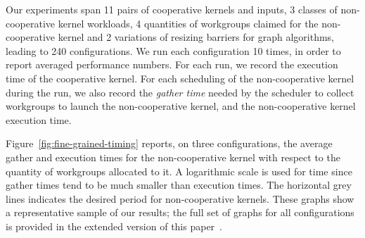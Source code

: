 \documentclass[sigconf]{acmart}
\newcommand{\myfiglong}{Figure~}
\begin{document}
{Our experiments span 11 pairs of cooperative kernels and inputs, 3
classes of non-cooperative kernel workloads, 4 quantities of
workgroups claimed for the non-cooperative kernel and 2 variations of
resizing barriers for graph algorithms, leading to 240 configurations.
We run each configuration 10 times, in order to report averaged
performance numbers. For each run, we record the execution time of the
cooperative kernel. For each scheduling of the non-cooperative kernel
during the run, we also record the \emph{gather time} needed by the
scheduler to collect workgroups to launch the non-cooperative kernel,
and the non-cooperative kernel execution time.
%




%
\myfiglong\ref{fig:fine-grained-timing} reports, on three
configurations, the average gather and execution times for the
non-cooperative kernel with respect to the quantity of workgroups allocated to
it.  A logarithmic scale is used for time since gather times tend to
be much smaller than execution times. The horizontal grey lines
indicates the desired period for non-cooperative kernels.  These
graphs show a representative sample of our results; the full set of
graphs for all configurations is provided in the extended version of this paper~\cite{ExtendedVersion}.

}
\end{document}
